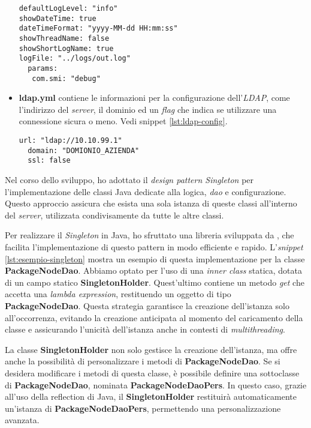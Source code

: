 \begin{itemize}
\begin{lstlisting}[caption={Esempio di configurazione del \textit{logger.yml}.},captionpos=b, label={lst:logger-config}]
defaultLogLevel: "info"
showDateTime: true
dateTimeFormat: "yyyy-MM-dd HH:mm:ss"
showThreadName: false
showShortLogName: true
logFile: "../logs/out.log"
  params:
   com.smi: "debug"
  \end{lstlisting}
 \item \textbf{ldap.yml} contiene le informazioni per la configurazione dell'\textit{LDAP}, come l'indirizzo del \textit{server}, 
 il dominio ed un \textit{flag} che indica se utilizzare una connessione sicura o meno. Vedi snippet \ref*{lst:ldap-config}.
  \begin{lstlisting}[caption={Esempio di configurazione dell'\textit{ldap.yml}.},captionpos=b, label={lst:ldap-config}]
  url: "ldap://10.10.99.1"
  domain: "DOMIONIO_AZIENDA"
  ssl: false
  \end{lstlisting}
\end{itemize}

Nel corso dello sviluppo, ho adottato il \textit{design pattern Singleton} per l'implementazione delle classi Java 
dedicate alla logica, \textit{dao} e configurazione. Questo approccio assicura che esista una sola istanza di queste classi 
all'interno del \textit{server}, utilizzata condivisamente da tutte le altre classi.

Per realizzare il \textit{Singleton} in Java, ho sfruttato una libreria sviluppata da \azienda{}, che facilita 
l'implementazione di questo pattern in modo efficiente e rapido. L'\textit{snippet} \ref*{lst:esempio-singleton} mostra un esempio 
di questa implementazione per la classe \textbf{PackageNodeDao}. Abbiamo optato per l'uso di una \textit{inner class} statica, 
dotata di un campo statico \textbf{SingletonHolder}. Quest'ultimo contiene un metodo \textit{get} che accetta una \textit{lambda expression}, 
restituendo un oggetto di tipo \textbf{PackageNodeDao}. Questa strategia garantisce la creazione dell'istanza solo all'occorrenza, 
evitando la creazione anticipata al momento del caricamento della classe e assicurando l'unicità dell'istanza anche in contesti di \textit{multithreading}.

La classe \textbf{SingletonHolder} non solo gestisce la creazione dell'istanza, ma offre anche la possibilità di personalizzare i metodi 
di \textbf{PackageNodeDao}. Se si desidera modificare i metodi di questa classe, è possibile definire una sottoclasse di \textbf{PackageNodeDao}, 
nominata \textbf{PackageNodeDaoPers}. In questo caso, grazie all'uso della \gls{reflection} di Java, 
il \textbf{SingletonHolder} restituirà automaticamente un'istanza di \textbf{PackageNodeDaoPers}, permettendo una personalizzazione avanzata.
\newpage


